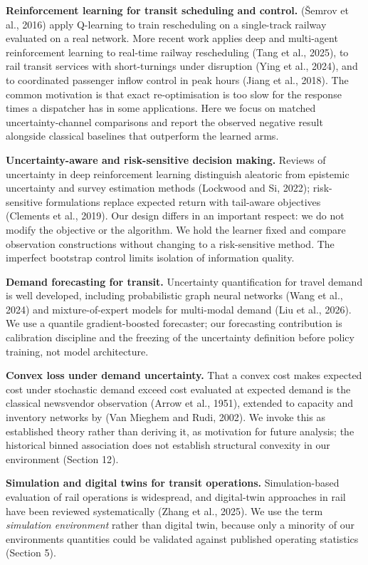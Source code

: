\documentclass[
]{article}
\begin{document}
\textbf{Reinforcement learning for transit scheduling and control.}
(Šemrov et al., 2016) apply Q-learning to train rescheduling on a
single-track railway evaluated on a real network. More recent work
applies deep and multi-agent reinforcement learning to real-time railway
rescheduling (Tang et al., 2025), to rail transit services with
short-turnings under disruption (Ying et al., 2024), and to coordinated
passenger inflow control in peak hours (Jiang et al., 2018). The common
motivation is that exact re-optimisation is too slow for the response
times a dispatcher has in some applications. Here we focus on matched
uncertainty-channel comparisons and report the observed negative result
alongside classical baselines that outperform the learned arms.

\textbf{Uncertainty-aware and risk-sensitive decision making.} Reviews
of uncertainty in deep reinforcement learning distinguish aleatoric from
epistemic uncertainty and survey estimation methods (Lockwood and Si,
2022); risk-sensitive formulations replace expected return with
tail-aware objectives (Clements et al., 2019). Our design differs in an
important respect: we do not modify the objective or the algorithm. We
hold the learner fixed and compare observation constructions without
changing to a risk-sensitive method. The imperfect bootstrap control
limits isolation of information quality.

\textbf{Demand forecasting for transit.} Uncertainty quantification for
travel demand is well developed, including probabilistic graph neural
networks (Wang et al., 2024) and mixture-of-expert models for
multi-modal demand (Liu et al., 2026). We use a quantile
gradient-boosted forecaster; our forecasting contribution is calibration
discipline and the freezing of the uncertainty definition before policy
training, not model architecture.

\textbf{Convex loss under demand uncertainty.} That a convex cost makes
expected cost under stochastic demand exceed cost evaluated at expected
demand is the classical newsvendor observation (Arrow et al., 1951),
extended to capacity and inventory networks by (Van Mieghem and Rudi,
2002). We invoke this as established theory rather than deriving it, as
motivation for future analysis; the historical binned association does
not establish structural convexity in our environment (Section 12).

\textbf{Simulation and digital twins for transit operations.}
Simulation-based evaluation of rail operations is widespread, and
digital-twin approaches in rail have been reviewed systematically (Zhang
et al., 2025). We use the term \emph{simulation environment} rather than
digital twin, because only a minority of our
environment\textquotesingle s quantities could be validated against
published operating statistics (Section 5).
\end{document}
